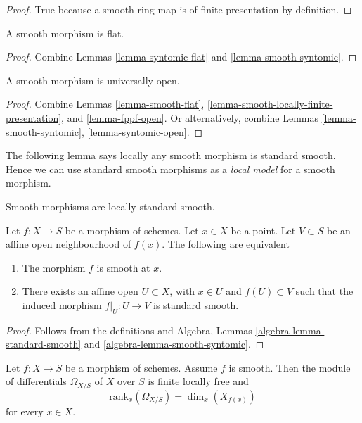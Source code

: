 \begin{proof}
True because a smooth ring map is of finite presentation by
definition.
\end{proof}

\begin{lemma}
\label{lemma-smooth-flat}
A smooth morphism is flat.
\end{lemma}

\begin{proof}
Combine Lemmas \ref{lemma-syntomic-flat} and \ref{lemma-smooth-syntomic}.
\end{proof}

\begin{lemma}
\label{lemma-smooth-open}
A smooth morphism is universally open.
\end{lemma}

\begin{proof}
Combine
Lemmas \ref{lemma-smooth-flat},
\ref{lemma-smooth-locally-finite-presentation}, and
\ref{lemma-fppf-open}.
Or alternatively, combine
Lemmas \ref{lemma-smooth-syntomic},
\ref{lemma-syntomic-open}.
\end{proof}

\noindent
The following lemma says locally any smooth morphism is standard smooth.
Hence we can use standard smooth morphisms as a {\it local model}
for a smooth morphism.

\begin{lemma}
\label{lemma-smooth-locally-standard-smooth}
\begin{slogan}
Smooth morphisms are locally standard smooth.
\end{slogan}
Let $f : X  \to S$ be a morphism of schemes.
Let $x \in X$ be a point.
Let $V \subset S$ be an affine open neighbourhood of $f(x)$.
The following are equivalent
\begin{enumerate}
\item The morphism $f$ is smooth at $x$.
\item There exists an affine open $U \subset X$,
with $x \in U$ and $f(U) \subset V$ such that the
induced morphism $f|_U : U \to V$ is standard smooth.
\end{enumerate}
\end{lemma}

\begin{proof}
Follows from the definitions and
Algebra, Lemmas \ref{algebra-lemma-standard-smooth}
and \ref{algebra-lemma-smooth-syntomic}.
\end{proof}

\begin{lemma}
\label{lemma-smooth-omega-finite-locally-free}
Let $f : X \to S$ be a morphism of schemes.
Assume $f$ is smooth.
Then the module of differentials $\Omega_{X/S}$ of $X$ over $S$
is finite locally free and
$$
\text{rank}_x(\Omega_{X/S}) = \dim_x(X_{f(x)})
$$
for every $x \in X$.
\end{lemma}


